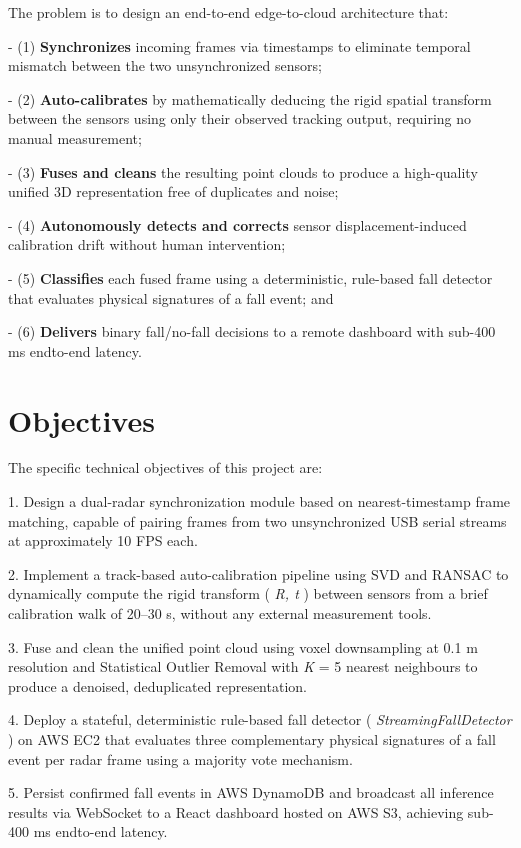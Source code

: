 The problem is to design an end-to-end edge-to-cloud architecture that: 

- (1) \textbf{Synchronizes} incoming frames via timestamps to eliminate temporal mismatch between the two unsynchronized sensors; 

- (2) \textbf{Auto-calibrates} by mathematically deducing the rigid spatial transform between the sensors using only their observed tracking output, requiring no manual measurement; 

- (3) \textbf{Fuses and cleans} the resulting point clouds to produce a high-quality unified 3D representation free of duplicates and noise; 

- (4) \textbf{Autonomously detects and corrects} sensor displacement-induced calibration drift without human intervention; 

- (5) \textbf{Classifies} each fused frame using a deterministic, rule-based fall detector that evaluates physical signatures of a fall event; and 

- (6) \textbf{Delivers} binary fall/no-fall decisions to a remote dashboard with sub-400 ms endto-end latency. 

\section{Objectives}

The specific technical objectives of this project are: 

1. Design a dual-radar synchronization module based on nearest-timestamp frame matching, capable of pairing frames from two unsynchronized USB serial streams at approximately 10 FPS each. 

2. Implement a track-based auto-calibration pipeline using SVD and RANSAC to dynamically compute the rigid transform ( \textit{R, t} ) between sensors from a brief calibration walk of 20--30 s, without any external measurement tools. 


3. Fuse and clean the unified point cloud using voxel downsampling at 0.1 m resolution and Statistical Outlier Removal with \textit{K} = 5 nearest neighbours to produce a denoised, deduplicated representation. 

4. Deploy a stateful, deterministic rule-based fall detector ( \textit{StreamingFallDetector} ) on AWS EC2 that evaluates three complementary physical signatures of a fall event per radar frame using a majority vote mechanism. 

5. Persist confirmed fall events in AWS DynamoDB and broadcast all inference results via WebSocket to a React dashboard hosted on AWS S3, achieving sub-400 ms endto-end latency. 

